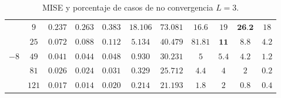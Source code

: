 \begin{table}[hbt]
\begin{tabular}{cc|ccccc|cccc}
		\cmidrule(r){8-11}										
		\multirow{5 }{*}{$-8$}	
		&  $9  $ 	&  	 $0.237$ 	&	 $0.263$ 	&	 $0.383$ 	&	 $18.106$ 	&	 $73.081$ 	&	$16.6$	&	$19$		& $\textbf{26.2}$ &	$18$ \\
		&  $25 $ 	&  	 $0.072$ 	&	 $0.088$ 	&	 $0.112$ 	&	 $5.134 $ 	&	 $40.479$ 	&	$81.81$	& $\textbf{11}$	&	$8.8$		&	$4.2$ \\
		&  $49 $ 	&  	 $0.041$ 	&	 $0.044$ 	&	 $0.048$ 	&	 $0.930 $ 	&	 $30.231$ 	&	$5$	&	$5.4$		&	$4.2$		&	$1.2$ \\
		&  $81 $ 	&  	 $0.026$ 	&	 $0.024$ 	&	 $0.031$ 	&	 $0.329 $ 	&	 $25.712$ 	&	$4.4$	&	$4$		&	$2$		&	$0.2$ \\
		&  $121$ 	&  	 $0.017$ 	&	 $0.014$ 	&	 $0.020$ 	&	 $0.214 $ 	&	 $21.193$ 	&	$1.8$ 	&	$2$		&	$0.8$			&	$0.4$ \\
		\bottomrule
	\end{tabular}										
\caption{\label{MiseyCantCasosNoConvergenciaL=3} MISE y porcentaje de casos de no convergencia $L=3$.}									
\end{table}	

